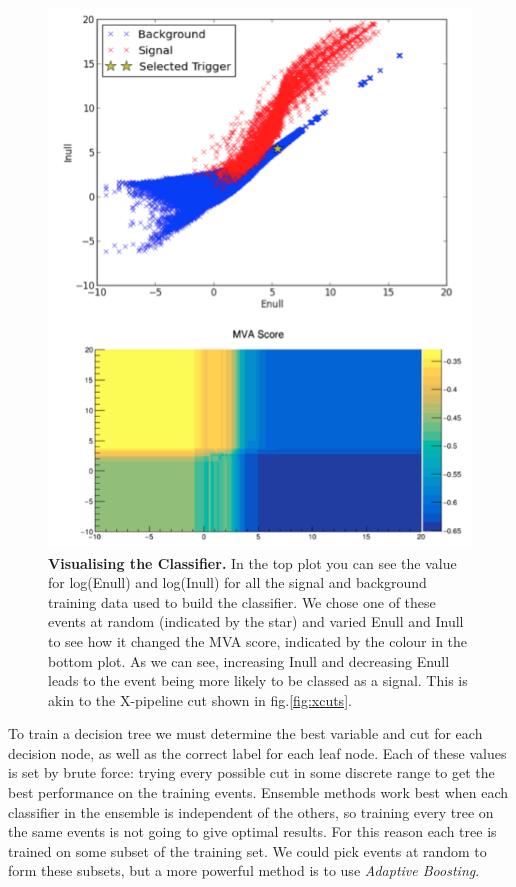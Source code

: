 \documentclass[11pt]{cuthesis}
\newcommand{\xp}{X-pipeline }
\begin{document}
\begin{figure} %
\begin{center}
\includegraphics[width=0.8\linewidth]{mva_trigger_and_score2.png}
\end{center}
\caption{\textbf{Visualising the Classifier.} In the top plot you can see the value for log(Enull) and log(Inull) for all the signal and background training data used to build the classifier. We chose one of these events at random (indicated by the star) and varied Enull and Inull to see how it changed the MVA score, indicated by the colour in the bottom plot. As we can see, increasing Inull and decreasing Enull leads to the event being more likely to be classed as a signal. This is akin to the \xp cut shown in fig.\ref{fig:xcuts}. }
\label{fig:mvacuts}
\end{figure}

To train a decision tree we must determine the best variable and cut for each decision node, as well as the correct label for each leaf node. Each of these values is set by brute force: trying every possible cut in some discrete range to get the best performance on the training events. Ensemble methods work best when each classifier in the ensemble is independent of the others, so training every tree on the same events is not going to give optimal results. For this reason each tree is trained on some subset of the training set. We could pick events at random to form these subsets, but a more powerful method is to use \textit{Adaptive Boosting}. 
\end{document}
